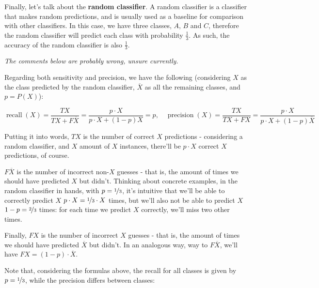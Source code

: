 \documentclass[12pt]{article}
\begin{document}
\begin{enumerate}[leftmargin=\labelsep]
        Finally, let's talk about the \textbf{random classifier}. A random classifier
        is a classifier that makes random predictions, and is usually used as a baseline
        for comparison with other classifiers. In this case, we have three classes, $A$, $B$ and $C$,
        therefore the random classifier will predict each class with probability $\frac{1}{3}$.
        As such, the accuracy of the random classifier is also $\frac{1}{3}$.

        \textit{The comments below are probably wrong, unsure currently.}


        Regarding both sensitivity and precision, we have the following (considering
        $X$ as the class predicted by the random classifier, $\overline{X}$ as all
        the remaining classes, and $p = P(X)$):

        \begin{equation*}
          \operatorname{recall}(X) = \frac{TX}{TX + F\overline{X}} = \frac{p \cdot X}{p \cdot X + (1 - p) X} = p, \quad
          \operatorname{precision}(X) = \frac{TX}{TX + FX} = \frac{p \cdot X}{p \cdot X + (1 - p) \overline{X}}
        \end{equation*}

        Putting it into words, $TX$ is the number of correct $X$ predictions - considering
        a random classifier, and $X$ amount of $X$ instances, there'll be $p \cdot X$ correct
        $X$ predictions, of course.

        $F\overline{X}$ is the number of incorrect non-$X$ guesses - that is, the
        amount of times we should have predicted $X$ but didn't. Thinking about concrete
        examples, in the random classifier in hands, with $p = \nicefrac{1}{3}$, it's
        intuitive that we'll be able to correctly predict $X$ $p \cdot X = \nicefrac{1}{3} \cdot X$
        times, but we'll also not be able to predict $X$ $1 - p = \nicefrac{2}{3}$ times:
        for each time we predict $X$ correctly, we'll miss two other times.

        Finally, $FX$ is the number of incorrect $X$ guesses - that is, the amount of
        times we should have predicted $\overline{X}$ but didn't. In an analogous way,
        way to $F\overline{X}$, we'll have $FX = (1 - p) \cdot \overline{X}$.

        Note that, considering the formulas above, the recall for all classes is given
        by $p = \nicefrac{1}{3}$, while the precision differs between classes:


\end{enumerate}
\end{document}
